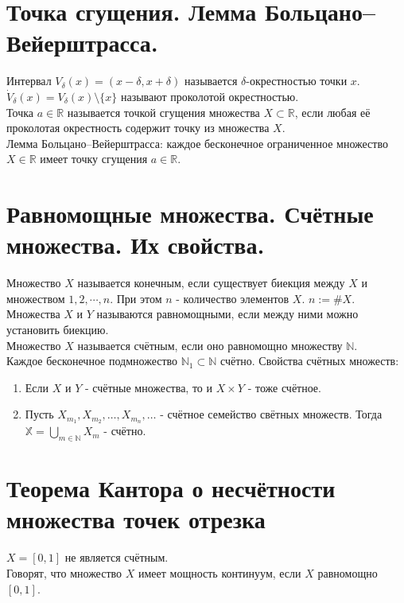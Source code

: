 \documentclass[11pt, a4paper, utf-8]{article}
\def\X{\mathbb{X}}
\def\R{\mathbb{R}}
\def\N{\mathbb{N}}
\def\ds{\displaystyle}
\begin{document}
    \section{Точка сгущения. Лемма Больцано--Вейерштрасса.}
    Интервал $V_{\delta} (x) = (x-\delta , x+\delta )$ называется $\delta$-окрестностью точки $x$.\\
    $\dot{V}_{\delta} (x) = V_{\delta} (x) \setminus \{x\}$ называют проколотой окрестностью.\\
    Точка $a \in \R$ называется точкой сгущения множества $X \subset \R$, если любая её проколотая окрестность содержит точку из множества $X$.\\
    Лемма Больцано--Вейерштрасса: каждое бесконечное ограниченное множество $X \in \R$ имеет точку сгущения $a \in \R$.

    \section{Равномощные множества. Счётные множества. Их свойства.}
    Множество $X$ называется конечным, если существует биекция между $X$ и множеством $1, 2, \cdots , n$. При этом $n$ - количество элементов $X$. $n:= \# X$.\\
    Множества $X$ и $Y$ называются равномощными, если между ними можно установить биекцию.\\
    Множество $X$ называется счётным, если оно равномощно множеству $\N$.\\
    Каждое бесконечное подмножество $\N_1 \subset \N$ счётно.
    Свойства счётных множеств:
    \begin{enumerate}
        \item Если $X$ и $Y$ - счётные множества, то и $X \times Y$ - тоже счётное.
        \item Пусть $X_{m_1}, X_{m_2}, \ldots, X_{m_n}, \ldots$ - счётное семейство свётных множеств. Тогда $\ds \X = \bigcup_{m \in \N} X_m$ - счётно.
    \end{enumerate}

    \section{Теорема Кантора о несчётности множества точек отрезка}
    $X=[0,1]$ не является счётным.\\
    Говорят, что множество $X$ имеет мощность континуум, если $X$ равномощно $[0,1]$.
\end{document}
